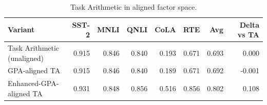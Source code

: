 \begin{table}[htbp]
\centering
\caption{Task Arithmetic in aligned factor space.}
\label{tab:ta-aligned}
\begin{tabular}{lrrrrrrr}
\toprule
Variant & SST-2 & MNLI & QNLI & CoLA & RTE & Avg & Delta vs TA \\
\midrule
Task Arithmetic (unaligned) & 0.915 & 0.846 & 0.840 & 0.193 & 0.671 & 0.693 & 0.000 \\
GPA-aligned TA & 0.915 & 0.846 & 0.840 & 0.189 & 0.671 & 0.692 & -0.001 \\
Enhanced-GPA-aligned TA & 0.931 & 0.848 & 0.856 & 0.516 & 0.856 & 0.802 & 0.108 \\
\bottomrule
\end{tabular}
\end{table}
